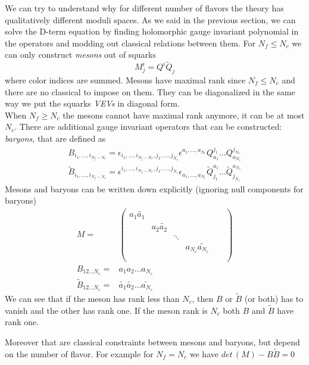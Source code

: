 We can try to understand why for different number of flavors the theory has qualitatively different moduli spaces. 
As we said in the previous section, we can solve the D-term equation by finding holomorphic gauge invariant polynomial in the operators and modding out classical relations between them.
For $N_f \le N_c$ we can only construct \emph{mesons} out of squarks
\begin{equation}
  M^i_j = Q^i \tilde{Q}_j
 \end{equation} 
where color indices are summed. 
Mesons have maximal rank since $N_f \le N_c$ and there are no  classical to impose on them. 
They can be diagonalized in the same way we put the squarks \emph{VEVs} in diagonal form.\\ 
When $N_f \geq N_c$ the mesons cannot have maximal rank anymore, it can be at most $N_c$.
There are additional gauge invariant operators that can be constructed: \emph{baryons}, that are defined as
\begin{align}
 B_{ i_1, \dotsc, i_{N_f - N_c}} = \epsilon_{i_1, \dotsc, i_{N_f - N_c}, j_1 ,\dotsc, j_{N_c}} \epsilon^{a_1 , \dotsc, a_{N_c}} Q^{j_1}_{a_1} \dots Q^{j_{N_c}}_{a_{N_c}}
 \\
 \tilde{B}_{ i_1, \dotsc, i_{N_f - N_c}} = \epsilon^{i_1, \dotsc, i_{N_f - N_c}, j_1 , \dotsc, j_{N_c}} \epsilon_{a_1 , \dotsc, a_{N_c}} \tilde{Q}_{j_1}^{a_1} \dots \tilde{Q}_{j_{N_c}}^{a_{N_c}}
\end{align}
Mesons and baryons can be written down explicitly (ignoring null components for baryons)
\begin{align}
M =& \begin{pmatrix}
a_1 \tilde{a_1} & & & & & \\
				& a_2 \tilde{a_2}	& 		&		 & & \\
				&				 	& \ddots&		& 	& \\
				&					&		& a_{N_c} \tilde{a_{N_c}} & \\
				& & & & & \\	
\end{pmatrix}
\\
B_{1 2 \dots {N_c}} =& a_1 a_2 \dots a_{N_c} 
\\
\tilde{B}_{1 2 \dots {N_c}} =& \tilde{a_1} \tilde{a_2}\dots \tilde{a_{N_c}}
\end{align}
We can see that if the meson has rank less than $N_c$, then $B$ or $\tilde{B}$ (or both) has to vanish and the other has rank one. If the meson rank is $N_c$ both $B$ and $\tilde{B}$ have rank one.

Moreover that are classical constraints between mesons and baryons, but depend on the number of flavor.
For example for $N_f = N_c$ we have $ det \,( M) - B \tilde{B} = 0$




















